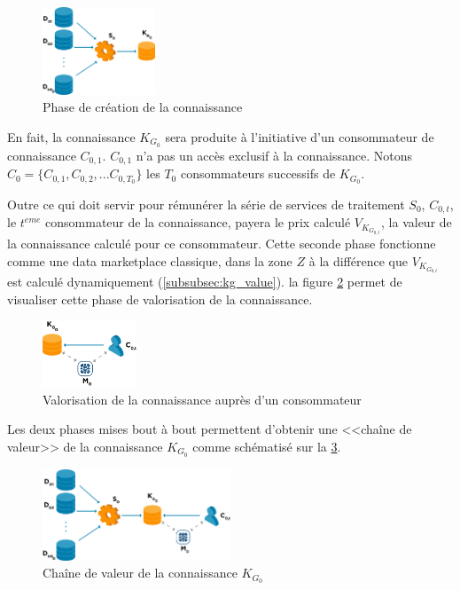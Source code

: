 \begin{figure}[h]
    \centering
    \includegraphics[width=0.3\textwidth]{ILLUSTRATIONS/graph_k0.png}
    \caption{Phase de création de la connaissance}
    \label{fig:first_side_market_place}
\end{figure}


En fait, la connaissance $K_{G_0}$ sera produite à l'initiative d'un consommateur de connaissance $C_{0,1}$. $C_{0,1}$ n'a pas un accès exclusif à la connaissance. Notons $C_0 = \{C_{0,1}, C_{0,2}, ... C_{0,T_0}\}$ les $T_0$ consommateurs successifs de $K_{G_0}$.

Outre ce qui doit servir pour rémunérer la série de services de traitement $S_0$, $C_{0,t}$, le $t^{eme}$ consommateur de la connaissance, payera le prix calculé $V_{K_{G_{0,t}}}$, la valeur de la connaissance calculé pour ce consommateur. Cette seconde phase fonctionne comme une data marketplace classique, dans la zone $Z$ à la différence que $V_{K_{G_{0,t}}}$ est calculé dynamiquement (\ref{subsubsec:kg_value}). la figure \ref{fig:scnd_side_market_place} permet de visualiser cette phase de valorisation de la connaissance.


\begin{figure} [h]
    \centering
    \includegraphics[width=0.25\textwidth]{ILLUSTRATIONS/market_k0_update.png}
    \caption{Valorisation de la connaissance auprès d'un consommateur}
    \label{fig:scnd_side_market_place}
\end{figure}

Les deux phases mises bout à bout permettent d'obtenir une <<chaîne de valeur>> de la connaissance $K_{G_0}$ comme schématisé sur la \ref{fig:market_place}.

\begin{figure}[h]
    \centering
    \includegraphics[width=0.5\textwidth]{ILLUSTRATIONS/kg_graph_k0.png}
    \caption{Chaîne de valeur de la connaissance $K_{G_0}$}
    \label{fig:market_place}
\end{figure}


